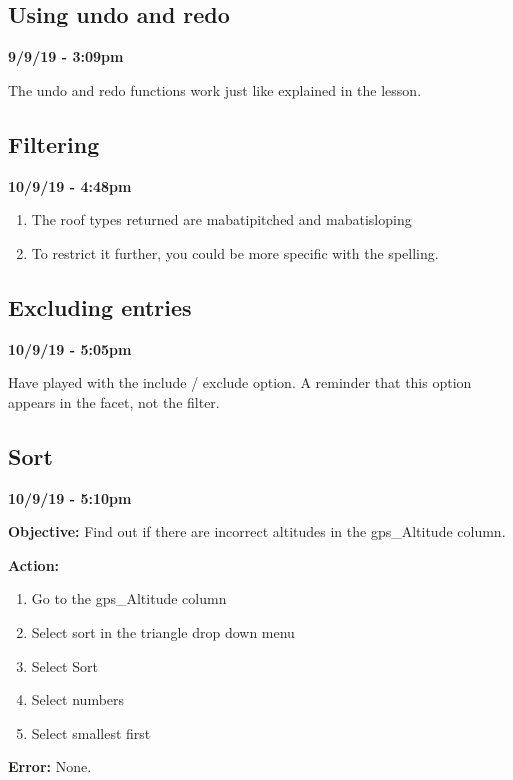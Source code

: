 \documentclass{article}
\begin{document}
\subsection{Using undo and redo}

\textbf{9/9/19 - 3:09pm}

The undo and redo functions work just like explained in the lesson.

\subsection{Filtering}

\textbf{10/9/19 - 4:48pm}

\begin{enumerate}
    \item The roof types returned are mabatipitched and mabatisloping
    \item To restrict it further, you could be more specific with the spelling.
\end{enumerate}

\subsection{Excluding entries}

\textbf{10/9/19 - 5:05pm}

Have played with the include / exclude option. A reminder that this option appears in the facet, not the filter.

\subsection{Sort}

\textbf{10/9/19 - 5:10pm}

\textbf{Objective:} Find out if there are incorrect altitudes in the gps\_Altitude column.

\textbf{Action:}

\begin{enumerate}
    \item Go to the gps\_Altitude column
    \item Select sort in the triangle drop down menu
    \item Select Sort
    \item Select numbers
    \item Select smallest first
\end{enumerate}

\textbf{Error:} None.
\end{document}
